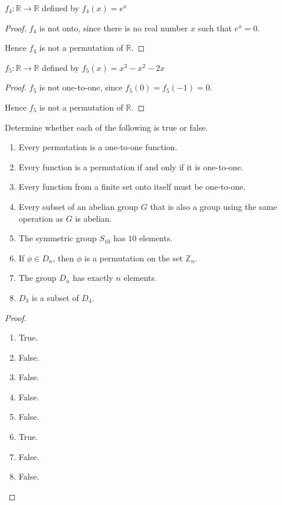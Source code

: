 \newpage
\begin{exercise}
    $f_{4}: \mathbb{R} \to \mathbb{R}$ defined by $f_{4}(x) = e^{x}$
\end{exercise}

\begin{proof}
    $f_{4}$ is not onto, since there is no real number $x$ such that $e^{x} = 0$.

    Hence $f_{4}$ is not a permutation of $\mathbb{R}$.
\end{proof}

\newpage
\begin{exercise}
    $f_{5}: \mathbb{R} \to \mathbb{R}$ defined by $f_{5}(x) = x^{3} - x^{2} - 2x$
\end{exercise}

\begin{proof}
    $f_{5}$ is not one-to-one, since $f_{5}(0) = f_{5}(-1) = 0$.

    Hence $f_{5}$ is not a permutation of $\mathbb{R}$.
\end{proof}

\newpage
\begin{exercise}
    Determine whether each of the following is true or false.
    \begin{enumerate}[label={\textbf{\alph*.}}]
        \item Every permutation is a one-to-one function.
        \item Every function is a permutation if and only if it is one-to-one.
        \item Every function from a finite set onto itself must be one-to-one.
        \item Every subset of an abelian group $G$ that is also a group using the same operation as $G$ is abelian.
        \item The symmetric group $S_{10}$ has $10$ elements.
        \item If $\phi\in D_{n}$, then $\phi$ is a permutation on the set $\mathbb{Z}_{n}$.
        \item The group $D_{n}$ has exactly $n$ elements.
        \item $D_{3}$ is a subset of $D_{4}$.
    \end{enumerate}
\end{exercise}

\begin{proof}
    \begin{enumerate}[label={\textbf{\alph*.}}]
        \item True.
        \item False.
        \item False.
        \item False.
        \item False.
        \item True.
        \item False.
        \item False.
    \end{enumerate}
\end{proof}

